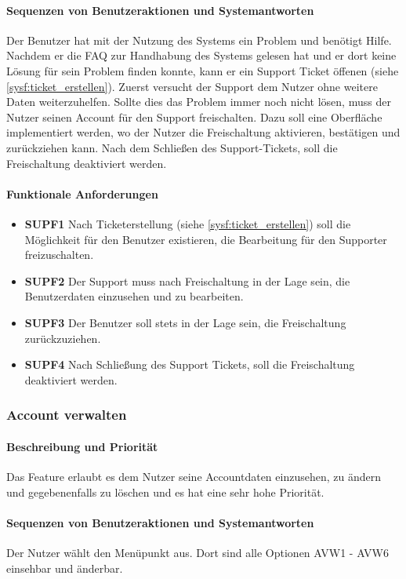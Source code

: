 \paragraph{Sequenzen von Benutzeraktionen und Systemantworten}
Der Benutzer hat mit der Nutzung des Systems ein Problem und benötigt Hilfe.
Nachdem er die FAQ zur Handhabung des Systems gelesen hat und er dort keine Lösung für sein Problem finden konnte,
kann er ein Support Ticket öffenen (siehe \ref{sysf:ticket_erstellen}).
Zuerst versucht der Support dem Nutzer ohne weitere Daten weiterzuhelfen.
Sollte dies das Problem immer noch nicht lösen, muss der Nutzer seinen Account für den Support freischalten.
Dazu soll eine Oberfläche implementiert werden, wo der Nutzer die Freischaltung aktivieren, bestätigen und zurückziehen kann.
Nach dem Schließen des Support-Tickets, soll die Freischaltung deaktiviert werden.
\paragraph{Funktionale Anforderungen}
\begin{itemize}
	\item \textbf{SUPF1} Nach Ticketerstellung (siehe \ref{sysf:ticket_erstellen}) soll die Möglichkeit für den Benutzer existieren, die Bearbeitung für den Supporter freizuschalten.
	\item \textbf{SUPF2} Der Support muss nach Freischaltung in der Lage sein, die Benutzerdaten einzusehen und zu bearbeiten.
	\item \textbf{SUPF3} Der Benutzer soll stets in der Lage sein, die Freischaltung zurückzuziehen.
	\item \textbf{SUPF4} Nach Schließung des Support Tickets, soll die Freischaltung deaktiviert werden.
\end{itemize}


\subsubsection{Account verwalten}
\paragraph{Beschreibung und Priorität}
Das Feature erlaubt es dem Nutzer seine Accountdaten einzusehen, zu ändern und gegebenenfalls zu löschen
und es hat eine sehr hohe Priorität.

\paragraph{Sequenzen von Benutzeraktionen und Systemantworten}
Der Nutzer wählt den Menüpunkt  aus.
Dort sind alle Optionen AVW1 - AVW6 einsehbar und änderbar.


